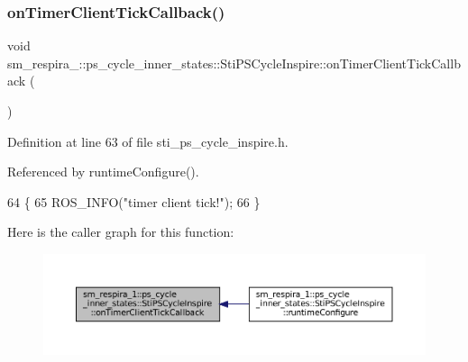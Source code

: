 \subsubsection{\texorpdfstring{on\+Timer\+Client\+Tick\+Callback()}{onTimerClientTickCallback()}}
{\footnotesize\ttfamily void sm\+\_\+respira\+\_\+::ps\+\_\+cycle\+\_\+inner\+\_\+states\+::\+Sti\+P\+S\+Cycle\+Inspire\+::on\+Timer\+Client\+Tick\+Callback (\begin{DoxyParamCaption}{ }\end{DoxyParamCaption})\hspace{0.3cm}{\ttfamily [inline]}}



Definition at line 63 of file sti\+\_\+ps\+\_\+cycle\+\_\+inspire.\+h.



Referenced by runtime\+Configure().


\begin{DoxyCode}
64   \{
65     ROS\_INFO(\textcolor{stringliteral}{"timer client tick!"});
66   \}
\end{DoxyCode}
Here is the caller graph for this function\+:
\nopagebreak
\begin{figure}[H]
\begin{center}
\leavevmode
\includegraphics[width=350pt]{structsm__respira__1_1_1ps__cycle__inner__states_1_1StiPSCycleInspire_a2bc93095187e5dac5c21cb899555678c_icgraph}
\end{center}
\end{figure}
\mbox{\label{structsm__respira__1_1_1ps__cycle__inner__states_1_1StiPSCycleInspire_a9af0139728042cf48d7a9e5c70cd8f41}} 
